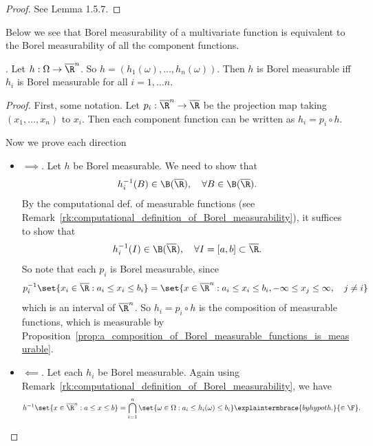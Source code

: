 \documentclass{article} %
\begin{document}
\begin{proof}
See \cite{ash2000probability} Lemma 1.5.7.
\end{proof}


Below we see that Borel measurability of a multivariate function is equivalent to the Borel measurability of all the component functions.

\begin{proposition}
\cite[Thm.~1.5.8]{ash2000probability}.   Let $h : \Omega \to \overline{\R}^n$.  So $h=(h_1(\omega), \hdots, h_n(\omega))$.  Then $h$ is Borel measurable iff $h_i$ is Borel measurable for all $i=1,\hdots n$.  
\label{prop:multivariate_function_is_Borel_measurbale_iff_component_functions_are_Borel_measurable}
\end{proposition}

\begin{proof}
First, some notation.  Let $p_i : \overline{\R}^n \to \overline{\R}$ be the projection map taking $(x_1,\hdots, x_n)$ to $x_i$.   Then each component function can be written as $h_i = p_i \circ h$.

Now we prove each direction
\begin{itemize}
\item $\boxed{\implies}$.  Let $h$ be Borel measurable. We need to show that
\[ h_i^{-1}(B) \in \B(\overline{\R}), \quad \forall B \in \B(\overline{\R}). \]
By the computational def. of measurable functions (see Remark~\ref{rk:computational_definition_of_Borel_measurability}), it suffices to show that 
\[ h_i^{-1}(I) \in \B(\overline{\R}), \quad \forall I = [a,b] \subset \overline{\R}.\]
So note that each $p_i$ is Borel measurable, since 
 \[ p_i^{-1} \set{x_i \in \overline{\R} : a_i \leq x_i \leq b_i} = \set{x \in \overline{\R}^n : a_i \leq x_i \leq b_i,  -\infty \leq x_j \leq \infty, \quad j \neq i }\]
 which is an interval of $\overline{\R}^n$.  So $h_i = p_i \circ h$ is the composition of measurable functions, which is measurable by Proposition~\ref{prop:a_composition_of_Borel_measurable_functions_is_measurable}.

\item $\boxed{\impliedby}$. Let each $h_i$ be Borel measurable.   Again using Remark~\ref{rk:computational_definition_of_Borel_measurability}, we have
\begin{align*}
h^{-1} \set{x \in \overline{\R}^n : a \leq x \leq b} &= \bigcap_{i=1}^n \set{\omega \in \Omega : a_i \leq h_i(\omega) \leq b_i} \explaintermbrace{by hypoth.}{\in \F}.
\end{align*}
  
\end{itemize}
 	
\end{proof}
\end{document}
